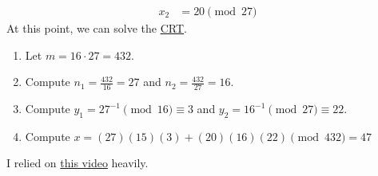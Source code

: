 {\begin{align*}
        x_2 &= 20 \pmod{27}
    \end{align*}
    At this point, we can solve the \hyperlink{thm:Chinese Remainder}{CRT}. 
    \begin{enumerate}
        \item Let \(m = 16 \cdot 27 = 432\).
        \item Compute \(n_1 = \frac{432}{16} = 27\) and \(n_2 = \frac{432}{27} = 16\).
        \item Compute \(y_1 = 27^{-1} \pmod{16} \equiv 3\) and \(y_2 = 16^{-1} \pmod{27} \equiv 22\).
        \item Compute \(x = (27)(15)(3) + (20)(16)(22) \pmod{432} = 47\)
    \end{enumerate} I relied on \href{https://www.youtube.com/watch?v=CHfP5tBbiAg}{this video} heavily.
}

